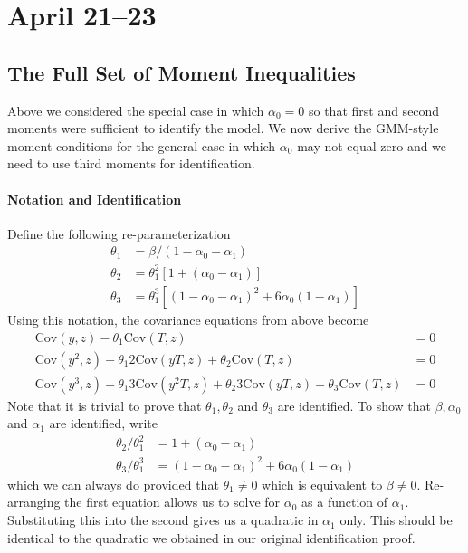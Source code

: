 \documentclass[12pt]{article}
\begin{document}
\section{April 21--23}
\subsection*{The Full Set of Moment Inequalities}
Above we considered the special case in which $\alpha_0= 0$ so that first and second moments were sufficient to identify the model.
We now derive the GMM-style moment conditions for the general case in which $\alpha_0$ may not equal zero and we need to use third moments for identification.


\paragraph{Notation and Identification} Define the following re-parameterization
\begin{align*}
  \theta_1 &= \beta/(1 - \alpha_0 - \alpha_1)\\
  \theta_2 &= \theta_1^2 \left[ 1 + (\alpha_0 - \alpha_1) \right]\\
  \theta_3 &= \theta_1^3\left[ \left( 1 - \alpha_0 - \alpha_1 \right)^2 + 6\alpha_0\left( 1 - \alpha_1 \right) \right]
\end{align*}
Using this notation, the covariance equations from above become
\begin{align*}
  \mbox{Cov}(y,z) - \theta_1 \mbox{Cov}(T,z) &= 0\\
  \mbox{Cov}(y^2,z) - \theta_1 2\mbox{Cov}(yT,z) + \theta_2 \mbox{Cov}(T,z)&= 0\\
  \mbox{Cov}(y^3,z) - \theta_1 3 \mbox{Cov}(y^2T,z) + \theta_2 3\mbox{Cov}(yT,z) - \theta_3\mbox{Cov}(T,z) &= 0
\end{align*}
Note that it is trivial to prove that $\theta_1, \theta_2$ and $\theta_3$ are identified.
To show that $\beta, \alpha_0$ and $\alpha_1$ are identified, write
\begin{align*}
  \theta_2/\theta_1^2 &= 1 + \left( \alpha_0 - \alpha_1 \right)\\
  \theta_3/\theta_1^3 &= (1 - \alpha_0 - \alpha_1)^2 + 6\alpha_0 (1 - \alpha_1) 
\end{align*}
which we can always do provided that $\theta_1\neq 0$ which is equivalent to $\beta \neq 0$.
Re-arranging the first equation allows us to solve for $\alpha_0$ as a function of $\alpha_1$.
Substituting this into the second gives us a quadratic in $\alpha_1$ only.
This should be identical to the quadratic we obtained in our original identification proof.
\end{document}
